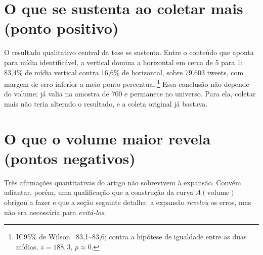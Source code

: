 \section{O que se sustenta ao coletar mais (ponto positivo)}

O resultado qualitativo central da tese se sustenta. Entre o conteúdo que aponta
para mídia identificável, a vertical domina a horizontal em cerca de 5 para 1:
83,4\% de mídia vertical contra 16,6\% de horizontal, sobre 79.603 tweets, com
margem de erro inferior a meio ponto percentual.\footnote{IC95\% de
Wilson~\cite{wilson1927interval}
83,1--83,6; contra a hipótese de igualdade entre as duas mídias, $z=188{,}3$,
$p\approx0$.} Essa conclusão não depende do volume; já valia
na amostra de 700 e permanece no universo. Para ela, coletar mais não teria
alterado o resultado, e a coleta original já bastava.

\section{O que o volume maior revela (pontos negativos)}

Três afirmações quantitativas do artigo não sobrevivem à expansão. Convém adiantar,
porém, uma qualificação que a construção da curva $A(\text{volume})$ obrigou a fazer
e que a seção seguinte detalha: a expansão \emph{revelou} os erros, mas não era
necessária para \emph{evitá-los}.

